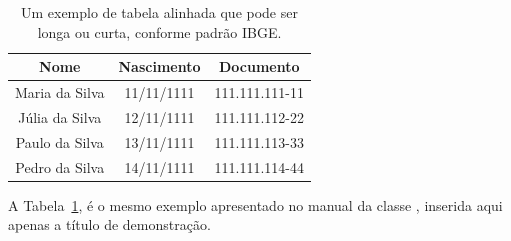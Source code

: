 \documentclass[times,english,brazil,oneside,section=TITLE]{ifes8}
\begin{document}
\begin{table}[h!]
    \caption[Um exemplo de tabela alinhada conforme padrão IBGE]{Um
      exemplo de tabela alinhada que pode ser longa ou curta, conforme
      padrão IBGE.}%
    \label{tabela-ibge}
    \begin{center}
      \begin{tabular}{ccc}
        \toprule
        Nome           & Nascimento & Documento      \\
        \midrule
        \midrule
        Maria da Silva & 11/11/1111 & 111.111.111-11 \\
        Júlia da Silva & 12/11/1111 & 111.111.112-22 \\
        Paulo da Silva & 13/11/1111 & 111.111.113-33 \\
        Pedro da Silva & 14/11/1111 & 111.111.114-44 \\
        \bottomrule
      \end{tabular}%
    \end{center}
\end{table}

A Tabela~\ref{tabela-ibge}, é o mesmo exemplo apresentado no manual da
classe \abnTeX, inserida aqui apenas a título de demonstração.
\end{document}
